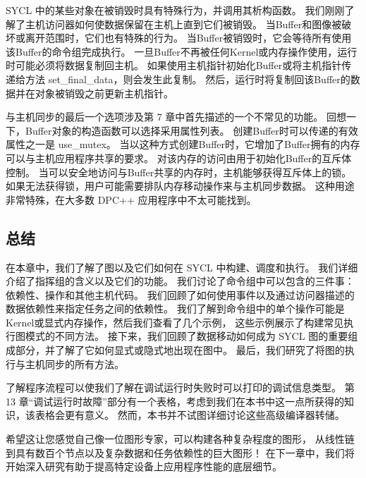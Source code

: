 SYCL 中的某些对象在被销毁时具有特殊行为，并调用其析构函数。 
我们刚刚了解了主机访问器如何使数据保留在主机上直到它们被销毁。 
当Buffer和图像被破坏或离开范围时，它们也有特殊的行为。 
当Buffer被销毁时，它会等待所有使用该Buffer的命令组完成执行。 
一旦Buffer不再被任何Kernel或内存操作使用，运行时可能必须将数据复制回主机。 
如果使用主机指针初始化Buffer或将主机指针传递给方法 set\_final\_data，则会发生此复制。 
然后，运行时将复制回该Buffer的数据并在对象被销毁之前更新主机指针。

与主机同步的最后一个选项涉及第 7 章中首先描述的一个不常见的功能。
回想一下，Buffer对象的构造函数可以选择采用属性列表。 
创建Buffer时可以传递的有效属性之一是 use\_mutex。 
当以这种方式创建Buffer时，它增加了Buffer拥有的内存可以与主机应用程序共享的要求。 
对该内存的访问由用于初始化Buffer的互斥体控制。 
当可以安全地访问与Buffer共享的内存时，主机能够获得互斥体上的锁。 
如果无法获得锁，用户可能需要排队内存移动操作来与主机同步数据。 
这种用途非常特殊，在大多数 DPC++ 应用程序中不太可能找到。

\subsection{总结}
在本章中，我们了解了图以及它们如何在 SYCL 中构建、调度和执行。 
我们详细介绍了指挥组的含义以及它们的功能。 
我们讨论了命令组中可以包含的三件事：依赖性、操作和其他主机代码。 
我们回顾了如何使用事件以及通过访问器描述的数据依赖性来指定任务之间的依赖性。 
我们了解到命令组中的单个操作可能是Kernel或显式内存操作，然后我们查看了几个示例，
这些示例展示了构建常见执行图模式的不同方法。 
接下来，我们回顾了数据移动如何成为 SYCL 图的重要组成部分，并了解了它如何显式或隐式地出现在图中。 
最后，我们研究了将图的执行与主机同步的所有方法。

了解程序流程可以使我们了解在调试运行时失败时可以打印的调试信息类型。 
第 13 章“调试运行时故障”部分有一个表格，考虑到我们在本书中这一点所获得的知识，该表格会更有意义。 
然而，本书并不试图详细讨论这些高级编译器转储。

希望这让您感觉自己像一位图形专家，可以构建各种复杂程度的图形，
从线性链到具有数百个节点以及复杂数据和任务依赖性的巨大图形！ 
在下一章中，我们将开始深入研究有助于提高特定设备上应用程序性能的底层细节。